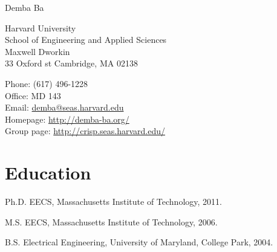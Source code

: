 \documentclass[12pt,letterpaper]{article}
\makeatletter
\let\saved@bibitem\@bibitem %
\def\HCode#1{}
\def\name{Demba Ba}
\renewenvironment{itemize}{
  \begin{list}{}{
    \setlength{\leftmargin}{1.5em}
    \setlength{\itemsep}{0.25em}
    \setlength{\parskip}{0pt}
    \setlength{\parsep}{0.25em}
  }
}{
  \end{list}
}
\makeatother
\begin{document}
\sloppy

\begingroup
\makeatletter
\let\@bibitem\saved@bibitem %
\endgroup

\HCode{<div class="fluid-container"}

\HCode{<div class="row">}
\HCode{<div class="col-md-12">}
\HCode{<h1>}
{\huge \name}
\HCode{</h1>}
\HCode{</div>} %
\HCode{</div>} %

\bigskip

\HCode{<div class="row">}
\HCode{<div class="col-md-4">}
\begin{minipage}[t]{0.5\textwidth}
  Harvard University \\
  School of Engineering and Applied Sciences \\
  Maxwell Dworkin \\
  33 Oxford st
  Cambridge, MA 02138 \\
\end{minipage}
\HCode{</div>} %
\HCode{<div class="col-md-8">}
\begin{minipage}[t]{0.5\textwidth}
  Phone: (617) 496-1228 \\
  Office: MD 143 \\
  Email: \href{mailto:demba@seas.harvard.edu}{demba@seas.harvard.edu} \\
  Homepage: \href{http://demba-ba.org/}{http://demba-ba.org/} \\
  Group page: \href{http://crisp.seas.harvard.edu}{http://crisp.seas.harvard.edu/}
\end{minipage}
\HCode{</div>} %
\HCode{</div>} %

\HCode{<div class="row">}
\HCode{<div class="col-md-12">}
\section*{Education}

\begin{itemize}
    \item Ph.D. EECS, Massachusetts Institute of Technology, 2011.
    \item M.S. EECS, Massachusetts Institute of Technology, 2006.
    \item B.S. Electrical Engineering,
    University of Maryland, College Park, 2004.
\end{itemize}
\end{document}
